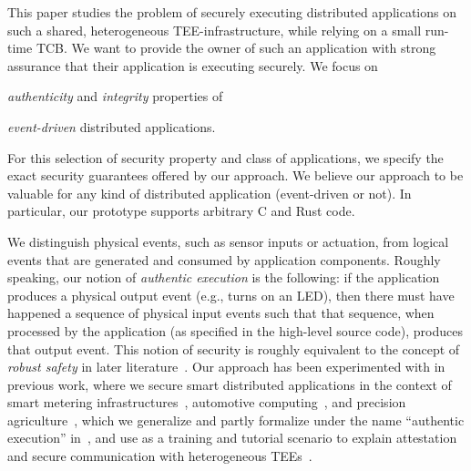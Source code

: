 This paper studies the problem of securely executing distributed applications on
such a shared, heterogeneous \ac{TEE}-infrastructure, while relying on  a small
run-time \ac{TCB}.  We want to provide the owner of such an application with
strong assurance that their application is executing securely.  We focus on
%
\begin{paraenum}
%
  \item \emph{authenticity} and \emph{integrity} properties of
%
  \item \emph{event-driven} distributed applications.
%
\end{paraenum}
%
For this selection of security property and class of applications, we specify
the exact security guarantees offered by our approach. We believe our approach
to be valuable for any kind of distributed application (event-driven or not). In
particular, our prototype supports arbitrary C and Rust code.

We distinguish physical events, such as sensor inputs or actuation, from logical
events that are generated and consumed by application components.
%
Roughly speaking, our notion of \emph{authentic execution} is the
following: if the application produces a physical output event (e.g., turns
on an LED), then there must have happened a sequence of physical input
events such that that sequence, when processed by the application (as
specified in the high-level source code), produces that output event.
%
This
notion of security is roughly equivalent to the concept of \emph{robust
safety} in later literature~\cite{abate2019journey}.
%
Our approach has been experimented with in previous work,
where we secure smart distributed applications in the context of smart
metering infrastructures~\cite{muehlber_smart_meter}, automotive
computing~\cite{vanbulck_2017vulcan}, and precision
agriculture~\cite{scopelliti2020thesis}, which we generalize and partly
formalize under the name \enquote{authentic execution}
in~\cite{noorman:authentic-execution}, and use as a training and tutorial
scenario to explain attestation and secure communication with heterogeneous
\acp{TEE}~\cite{muehlber_2018tutorial_enclaves}. 

